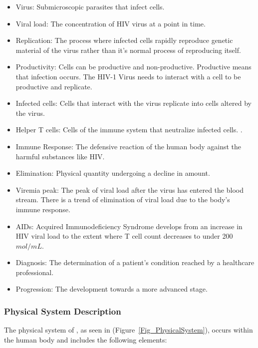 \documentclass[12pt]{article}
\begin{document}
\begin{itemize}

\item Virus: Submicroscopic parasites that infect cells. 
\item Viral load: The concentration of HIV virus at a point in time.
\item Replication: The process where infected cells rapidly reproduce genetic 
material of the virus rather than it's normal process of reproducing itself. 
\citep{BURRELL201739}
\item Productivity: Cells can be productive and non-productive. Productive means 
that infection occurs. The HIV-1 Virus needs to interact with a cell to be 
productive and replicate. \citep{BURRELL201739}
\item Infected cells: Cells that interact with the virus replicate into cells 
altered by the virus.
\item Helper T cells: Cells of the immune system that neutralize infected cells. 
\citep{william_2018}.
\item Immune Response: The defensive reaction of the human body against the 
harmful substances like HIV.
\item Elimination: Physical quantity undergoing a decline in amount.
\item Viremia peak: The peak of viral load after the virus has entered the blood 
stream. There is a trend of elimination of viral load due to the body's immune 
response. \citep{little1999}
\item AIDs: Acquired Immunodeficiency Syndrome develops from an increase in HIV 
viral load to the extent where T cell count decreases to under 200 
$mol/mL$.\citep{hiv.gov}
\item Diagnosis: The determination of a patient's condition reached by a 
healthcare professional.
\item Progression: The development towards a more advanced 
stage.


\end{itemize}

\subsubsection{Physical System Description} \label{sec_phySystDescrip}

The physical system of \progname{}, as seen in 
(Figure~\ref{Fig_PhysicalSystem}), occurs within the human body and includes the 
following elements:
\end{document}
